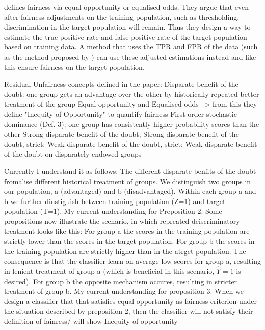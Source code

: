 \cite{kallus} defines fairness via equal opportunity or equalised odds. They argue that even after fairness adjustments on the training population, such as thresholding, discrimination in the target population will remain.
Thus they design a way to estimate the true positive rate and false positive rate of the target population based on training data. A method that uses the TPR and FPR of the data (such as the method proposed by \cite{hardt2016}) can use these adjusted estimations instead and like this ensure fairness on the target population.



Residual Unfairness \cite{kallus} concepts defined in the paper:
Disparate benefit of the doubt: one group gets an advantage over the other by historically repeated better treatment of the group
Equal opportunity and Equalised odds --> from this they define "Inequity of Opportunity" to quantify fairness
First-order stochastic dominance (Def. 3): one group has consistently higher probability scores than the other
Strong disparate benefit of the doubt; Strong disparate benefit of the doubt,  strict;
Weak disparate benefit of the doubt, strict; Weak disparate benefit of the doubt on disparately endowed groups

Currently I understand it as follows:
The different disparate benfits of the doubt fromalise different historical treatment of groups.
We distinguish two groups in our population, a (advantaged) and b (disadvantaged). Within each group a and b we further dinstiguish between training population (Z=1) and target population (T=1).
My current understanding for Preposition 2: Some propositions now illustrate the scenario, in which repreated deiscriminatory treatment looks like this: For group a the scores in the training population are strictly lower than the scores in the target population. For group b the scores in the training population are strictly higher than in the atrget population. The consequence is that the classifier learn on average low scores for group a, resulting in lenient treatment of group a (which is beneficial in this scenario, $\hat{Y} = 1$ is desired). For group b the opposite mechanism occures, resulting in stricter treatment of group b.
My current understanding for proposition 3: When we design a classifier that that satisfies equal opportunity as fairness criterion under the situation described by preposition 2, then the classifier will not satisfy their definition of fainress/ will show Inequity of opportunity


